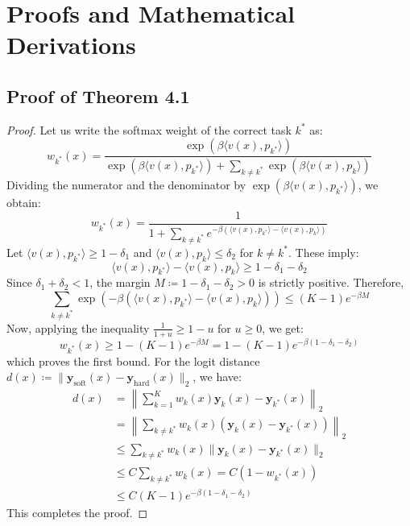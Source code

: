 \documentclass{article}
\theoremstyle{plain}
\theoremstyle{definition}
\theoremstyle{remark}
\begin{document}



\newpage
\onecolumn
\appendix
\section{Proofs and Mathematical Derivations}
\label{proofs-appendix}

\subsection{Proof of Theorem 4.1}
\label{proof-theorem}
\begin{proof}
Let us write the softmax weight of the correct task $k^*$ as:
\begin{equation*}
w_{k^*}(x) = \frac{\exp(\beta \langle v(x), p_{k^*} \rangle)}{\exp(\beta \langle v(x), p_{k^*} \rangle) + \sum_{k \neq k^*} \exp(\beta \langle v(x), p_k \rangle)}
\end{equation*}
Dividing the numerator and the denominator by $\exp(\beta \langle v(x), p_{k^*} \rangle)$, we obtain:
\begin{equation*}
w_{k^*}(x) = \frac{1}{1 + \sum_{k \neq k^*} e^{-\beta (\langle v(x), p_{k^*} \rangle - \langle v(x), p_k \rangle)}}
\end{equation*}
Let $\langle v(x), p_{k^*} \rangle \ge 1 - \delta_1$ and $\langle v(x), p_k \rangle \le \delta_2$ for $k \neq k^*$. These imply:
\begin{equation*}
\langle v(x), p_{k^*} \rangle - \langle v(x), p_k \rangle \ge 1 - \delta_1 - \delta_2
\end{equation*}
Since $\delta_1 + \delta_2 < 1$, the margin $M \coloneqq 1 - \delta_1 - \delta_2 > 0$ is strictly positive. Therefore,
\begin{equation*}
\sum_{k \neq k^*} \exp\left(-\beta (\langle v(x), p_{k^*} \rangle - \langle v(x), p_k \rangle)\right) \le (K-1) e^{-\beta M}
\end{equation*}
Now, applying the inequality $\frac{1}{1+u} \ge 1 - u$ for $u \ge 0$, we get:
\begin{equation*}
w_{k^*}(x) \ge 1 - (K-1) e^{-\beta M} = 1 - (K-1) e^{-\beta(1-\delta_1-\delta_2)}
\end{equation*}
which proves the first bound. For the logit distance $d(x) \coloneqq \|\mathbf{y}_{\text{soft}}(x) - \mathbf{y}_{\text{hard}}(x)\|_2$, we have:
\begin{align*}
d(x) &= \left\| \sum_{k=1}^K w_k(x) \mathbf{y}_k(x) - \mathbf{y}_{k^*}(x) \right\|_2 \\
&= \left\| \sum_{k \neq k^*} w_k(x) (\mathbf{y}_k(x) - \mathbf{y}_{k^*}(x)) \right\|_2 \\
&\le \sum_{k \neq k^*} w_k(x) \|\mathbf{y}_k(x) - \mathbf{y}_{k^*}(x)\|_2 \\
&\le C \sum_{k \neq k^*} w_k(x) = C (1 - w_{k^*}(x)) \\
&\le C (K-1) e^{-\beta(1-\delta_1-\delta_2)}
\end{align*}
This completes the proof.
\end{proof}
\end{document}
